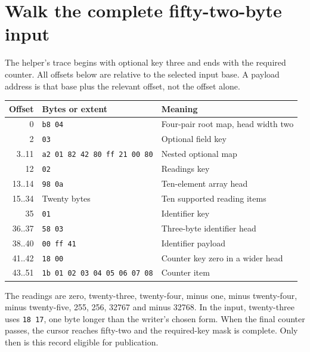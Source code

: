 \section{Walk the complete fifty-two-byte input}
The helper's trace begins with optional key three and ends with the required counter.
All offsets below are relative to the selected input base. A payload address is that
base plus the relevant offset, not the offset alone.

\begin{center}
  \begin{tabular}{rll}
    Offset & Bytes or extent                     & Meaning                            \\
    \hline
    0      & \texttt{b8 04}                      & Four-pair root map, head width two \\
    2      & \texttt{03}                         & Optional field key                 \\
    3..11  & \texttt{a2 01 82 42 80 ff 21 00 80} & Nested optional map                \\
    12     & \texttt{02}                         & Readings key                       \\
    13..14 & \texttt{98 0a}                      & Ten-element array head             \\
    15..34 & Twenty bytes                        & Ten supported reading items        \\
    35     & \texttt{01}                         & Identifier key                     \\
    36..37 & \texttt{58 03}                      & Three-byte identifier head         \\
    38..40 & \texttt{00 ff 41}                   & Identifier payload                 \\
    41..42 & \texttt{18 00}                      & Counter key zero in a wider head   \\
    43..51 & \texttt{1b 01 02 03 04 05 06 07 08} & Counter item                       \\
  \end{tabular}
\end{center}

The readings are zero, twenty-three, twenty-four, minus one, minus twenty-four, minus
twenty-five, 255, 256, 32767 and minus 32768. In the input, twenty-three uses
\texttt{18 17}, one byte longer than the writer's chosen form. When the final counter
passes, the cursor reaches fifty-two and the required-key mask is complete. Only then
is this record eligible for publication.
